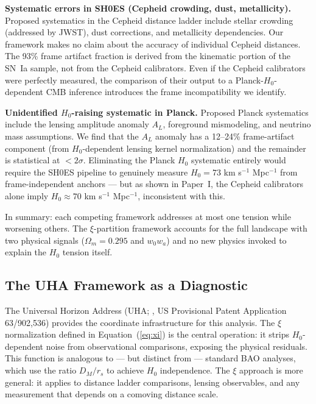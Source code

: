 \documentclass[twocolumn]{aastex631}
\begin{document}
\noindent\textbf{Systematic errors in SH0ES (Cepheid crowding, dust, metallicity).}
Proposed systematics in the Cepheid distance ladder include stellar crowding
\citep{Riess2023} (addressed by JWST), dust corrections, and metallicity
dependencies.
Our framework makes no claim about the accuracy of individual Cepheid distances.
The 93\% frame artifact fraction is derived from the kinematic portion of the
SN~Ia sample, not from the Cepheid calibrators.
Even if the Cepheid calibrators were perfectly measured, the comparison of their
output to a Planck-$H_0$-dependent CMB inference introduces the frame incompatibility
we identify.

\noindent\textbf{Unidentified $H_0$-raising systematic in Planck.}
Proposed Planck systematics include the lensing amplitude anomaly $A_L$,
foreground mismodeling, and neutrino mass assumptions.
We find that the $A_L$ anomaly has a 12--24\% frame-artifact component
(from $H_0$-dependent lensing kernel normalization) and the remainder is
statistical at $< 2\sigma$.
Eliminating the Planck $H_0$ systematic entirely would require the
SH0ES pipeline to genuinely measure $H_0 = 73$ km s$^{-1}$ Mpc$^{-1}$ from
frame-independent anchors --- but as shown in Paper~I, the Cepheid calibrators
alone imply $H_0 \approx 70$ km s$^{-1}$ Mpc$^{-1}$, inconsistent with this.

In summary: each competing framework addresses at most one tension
while worsening others.
The $\xi$-partition framework accounts for the full landscape with two
physical signals ($\Omega_m = 0.295$ and $w_0 w_a$) and no new physics
invoked to explain the $H_0$ tension itself.

\subsection{The UHA Framework as a Diagnostic}

The Universal Horizon Address (UHA; \citealt{Martin2026a}, US Provisional Patent Application 63/902,536)
provides the coordinate infrastructure for this analysis.
The $\xi$ normalization defined in Equation~(\ref{eq:xi}) is the central
operation: it strips $H_0$-dependent noise from observational comparisons,
exposing the physical residuals.
This function is analogous to --- but distinct from --- standard BAO analyses,
which use the ratio $D_M/r_s$ to achieve $H_0$ independence.
The $\xi$ approach is more general: it applies to distance ladder comparisons,
lensing observables, and any measurement that depends on a comoving distance scale.
\end{document}
